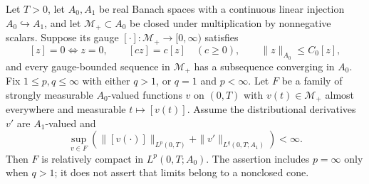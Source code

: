 Let $T>0$, let $A_0,A_1$ be real Banach spaces with a continuous linear injection $A_0\hookrightarrow A_1$, and let $\mathcal M_+\subset A_0$ be closed under multiplication by nonnegative scalars.
Suppose its gauge $[\cdot]:\mathcal M_+\to[0,\infty)$ satisfies
\[
[z]=0\Longleftrightarrow z=0,\qquad [cz]=c[z]\quad(c\ge0),
\qquad \|z\|_{A_0}\le C_0[z],
\]
and every gauge-bounded sequence in $\mathcal M_+$ has a subsequence converging in $A_0$.
Fix $1\le p,q\le\infty$ with either $q>1$, or $q=1$ and $p<\infty$.
Let $F$ be a family of strongly measurable $A_0$-valued functions $v$ on $(0,T)$ with $v(t)\in\mathcal M_+$ almost everywhere and measurable $t\mapsto[v(t)]$.
Assume the distributional derivatives $v'$ are $A_1$-valued and
\[
\sup_{v\in F}\left(\|[v(\cdot)]\|_{L^p(0,T)}+
\|v'\|_{L^q(0,T;A_1)}\right)<\infty.
\]
Then $F$ is relatively compact in $L^p(0,T;A_0)$.
The assertion includes $p=\infty$ only when $q>1$; it does not assert that limits belong to a nonclosed cone.